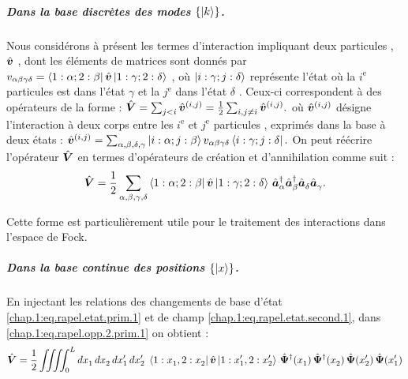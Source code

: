 \subparagraph{Dans la base discrètes des modes \( \{ \ket{k} \} \).}

Nous considérons à présent les termes d’interaction impliquant deux particules , $\hat{\bm{v}}$ , dont les éléments de matrices sont donnés par $v_{\alpha \beta \gamma \delta} = \bra{ 1 : \alpha; 2 : \beta } \hat{\bm{v}}\ket{ 1 : \gamma; 2 : \delta }$ , où $\ket{ i : \gamma; j : \delta }$ représente l'état où la $i^\text{e}$  particules est dans l'état $\gamma$ et la $j^\text{e}$ dans l'état $\delta$  . Ceux-ci correspondent à des opérateurs de la forme :
\(
    \hat{\bm{V}} = \sum_{j < i} \hat{\bm{v}}^{(i, j)} = \frac{1}{2} \sum_{i, j \ne i} \hat{\bm{v}}^{(i, j)}
    \label{eq:V2corps}.
\)
où $\hat{\bm{v}}^{(i, j)}$ désigne l’interaction à deux corps entre les $i^\text{e}$ et $j^\text{e}$ particules , exprimés dans la base à deux états :
\(
	\hat{\bm{v}}^{(i, j)} = \sum_{\alpha,\beta,\delta,\gamma} \ket{i : \alpha; j : \beta }v_{\alpha \beta \gamma \delta} \bra{ i : \gamma; j : \delta }.
    \label{eq:matriceV}
\)
On peut réécrire l’opérateur \( \hat{\bm{V}} \) en termes d’opérateurs de création et d’annihilation comme suit :
\begin{equation}
    \hat{\bm{V}} = \frac{1}{2} \sum_{\alpha, \beta, \gamma, \delta} \bra{ 1 : \alpha; 2 : \beta } \hat{\bm{v}}\ket{ 1 : \gamma; 2 : \delta } \, \hat{\bm{a}}^\dagger_\alpha \hat{\bm{a}}^\dagger_\beta \hat{\bm{a}}_\delta^{} \hat{\bm{a}}_\gamma^{}.
    \label{chap.1:eq.rapel.opp.2.prim.1}
\end{equation}

Cette forme est particulièrement utile pour le traitement des interactions dans l’espace de Fock.

\subparagraph{Dans la base continue des positions \( \{ \ket{x} \} \).}

En injectant les relations des changements de base d'état
\eqref{chap.1:eq.rapel.etat.prim.1} et de champ \eqref{chap.1:eq.rapel.etat.second.1}, dans \eqref{chap.1:eq.rapel.opp.2.prim.1} on obtient :
\begin{equation}
    \hat{\bm{V}} = \frac{1}{2} \iiiint_0^L dx_1^{} \, dx_2^{} \, dx_1' \, dx_2' \; 
    \bra{ 1 : x_1^{}, 2 : x_2^{} } \hat{\bm{v}} \ket{ 1 : x_1', 2 : x_2' } \,
    \hat{\bm{\Psi}}^\dagger(x_1^{}) \, \hat{\bm{\Psi}}^\dagger(x_2^{}) \, 
    \hat{\bm{\Psi}}(x_2') \, \hat{\bm{\Psi}}(x_1')
    \label{chap.1:eq.rapel.opp.2.second.1}
\end{equation}

